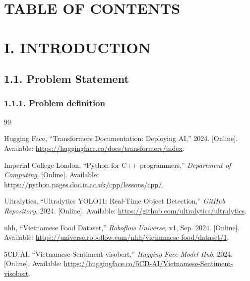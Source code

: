 \documentclass[12pt]{article}
\begin{document}
\newpage
\setlength{\cftbeforesecskip}{2pt}
\setlength{\cftbeforesubsecskip}{1pt}
\makeatletter
\renewcommand{\cftsecleader}{\normalfont\cftdotfill{\cftdotsep}}
\renewcommand\tableofcontents{%
    \section*{\centering \contentsname}
    \@starttoc{toc}%
}
\makeatother
\renewcommand{\contentsname}{TABLE OF CONTENTS}{\bfseries}
\tableofcontents
\renewcommand\listoffigures{
    \section*{\centering \listfigurename}
    \@starttoc{lof}
}
\makeatother
\newpage

\section{\fontsize{15pt}{18pt}\selectfont I. INTRODUCTION}
\subsection{1.1. Problem Statement}
\subsubsection{1.1.1. Problem definition}

\newpage
\begin{thebibliography}{99}

Hugging Face, ``Transformers Documentation: Deploying AI,'' 2024. [Online]. Available: \url{https://huggingface.co/docs/transformers/index}.

Imperial College London, ``Python for C++ programmers,'' \textit{Department of Computing}. [Online]. Available: \url{https://python.pages.doc.ic.ac.uk/cpp/lessons/cpp/}.

Ultralytics, ``Ultralytics YOLO11: Real-Time Object Detection,'' \textit{GitHub Repository}, 2024. [Online]. Available: \url{https://github.com/ultralytics/ultralytics}.

nhh, ``Vietnamese Food Dataset,'' \textit{Roboflow Universe}, v1, Sep. 2024. [Online]. Available: \url{https://universe.roboflow.com/nhh/vietnamese-food/dataset/1}.

5CD-AI, ``Vietnamese-Sentiment-visobert,'' \textit{Hugging Face Model Hub}, 2024. [Online]. Available: \url{https://huggingface.co/5CD-AI/Vietnamese-Sentiment-visobert}.

\end{thebibliography}
\end{document}

